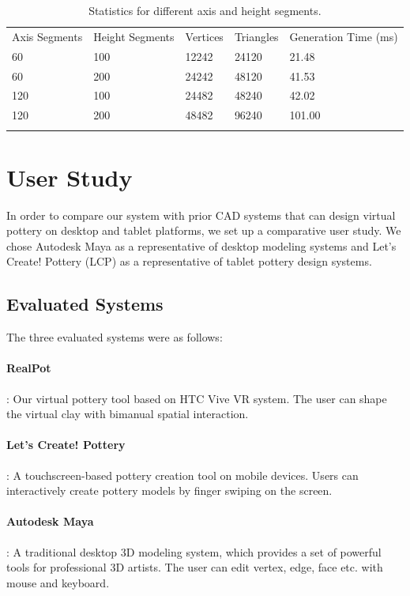 \documentclass{svjour3}                     %
\begin{document}
\begin{table}
\caption{Statistics for different axis and height segments.}
\label{tab:2}       %
\begin{tabular}{lllll}
\hline\noalign{\smallskip}
Axis Segments & Height Segments & Vertices & Triangles & Generation Time (ms)\\
\noalign{\smallskip}\hline\noalign{\smallskip}
60 & 100 & 12242 & 24120 & 21.48 \\
60 & 200 & 24242 & 48120 & 41.53 \\
120 & 100 & 24482 & 48240 & 42.02 \\
120 & 200 & 48482 & 96240 & 101.00 \\
\noalign{\smallskip}\hline
\end{tabular}
\end{table}

\section{User Study}
\label{sec:6}
In order to compare our system with prior CAD systems that can design virtual pottery on desktop and tablet platforms, we set up a comparative user study. We chose Autodesk Maya \cite{website:maya} as a representative of desktop modeling systems and Let's Create! Pottery (LCP) \cite{website:letspottery} as a representative of tablet pottery design systems.


\subsection{Evaluated Systems}
\label{sec:6.1}
The three evaluated systems were as follows:

\paragraph{RealPot}: Our virtual pottery tool based on HTC Vive VR system. The user can shape the virtual clay with bimanual spatial interaction.
\paragraph{Let’s Create! Pottery}: A touchscreen-based pottery creation tool on mobile devices. Users can interactively create pottery models by finger swiping on the screen.
\paragraph{Autodesk Maya}: A traditional desktop 3D modeling system, which provides a set of powerful tools for professional 3D artists. The user can edit vertex, edge, face etc. with mouse and keyboard.
\end{document}
